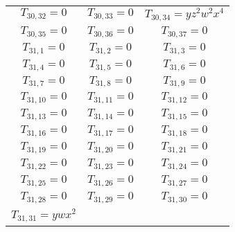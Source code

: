 \begin{longtable}{|c|c|c|}
$T_{30,32}= 0$&

$T_{30,33}= 0$&

$T_{30,34}= yz^2w^2x^4$\\

$T_{30,35}= 0$&

$T_{30,36}= 0$&

$T_{30,37}= 0$\\

$T_{31,1}= 0$&

$T_{31,2}= 0$&

$T_{31,3}= 0$\\

$T_{31,4}= 0$&

$T_{31,5}= 0$&

$T_{31,6}= 0$\\

$T_{31,7}= 0$&

$T_{31,8}= 0$&

$T_{31,9}= 0$\\

$T_{31,10}= 0$&

$T_{31,11}= 0$&

$T_{31,12}= 0$\\

$T_{31,13}= 0$&

$T_{31,14}= 0$&

$T_{31,15}= 0$\\

$T_{31,16}= 0$&

$T_{31,17}= 0$&

$T_{31,18}= 0$\\

$T_{31,19}= 0$&

$T_{31,20}= 0$&

$T_{31,21}= 0$\\

$T_{31,22}= 0$&

$T_{31,23}= 0$&

$T_{31,24}= 0$\\

$T_{31,25}= 0$&

$T_{31,26}= 0$&

$T_{31,27}= 0$\\

$T_{31,28}= 0$&

$T_{31,29}= 0$&

$T_{31,30}= 0$\\

$T_{31,31}= ywx^2$&


\end{longtable}

